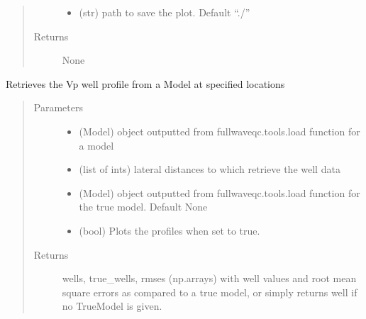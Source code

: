 \documentclass[letterpaper,10pt,english]{sphinxmanual}
\begin{document}
\begin{fulllineitems}
\begin{quote}
\begin{description}
\begin{itemize}
\item {} 
 \textendash{} (str)        path to save the plot. Default “./”

\end{itemize}

\item[{Returns}] \leavevmode
None

\end{description}\end{quote}

\end{fulllineitems}


\begin{fulllineitems}
\label{\detokenize{index:fullwaveqc.visual.vpwell}}
Retrieves the Vp well profile from a Model at specified locations
\begin{quote}\begin{description}
\item[{Parameters}] \leavevmode\begin{itemize}
\item {} 
 \textendash{} (Model)        object outputted from fullwaveqc.tools.load function for a model

\item {} 
 \textendash{} (list of ints) lateral distances to which retrieve the well data

\item {} 
 \textendash{} (Model)        object outputted from fullwaveqc.tools.load function for the true model.
Default None

\item {} 
 \textendash{} (bool)         Plots the profiles when set to true.

\end{itemize}

\item[{Returns}] \leavevmode
wells, true\_wells, rmses (np.arrays) with well values and root mean square errors as compared to a true
model, or simply returns well if no TrueModel is given.

\end{description}\end{quote}

\end{fulllineitems}
\end{document}
